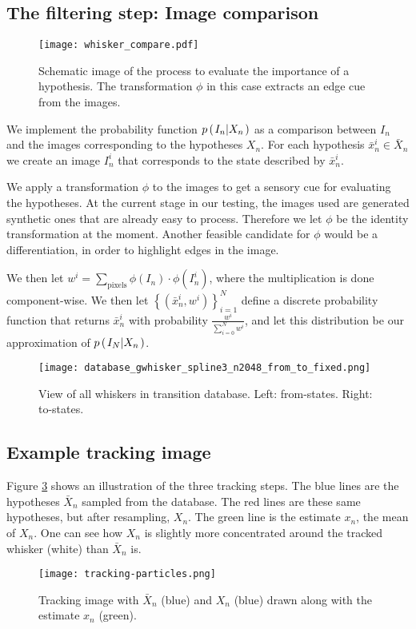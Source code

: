 \subsection*{The filtering step: Image comparison}

\begin{figure}
  \centering
  \texttt{[image: whisker\_compare.pdf]}
  \caption{Schematic image of the process to evaluate the importance of a hypothesis. The transformation $\phi$ in this case extracts an edge cue from the images.}
  \label{fig:whisker_compare}
\end{figure}

We implement the probability function $p\left(\left. I_n \middle\vert X_n \right.\right)$ as a comparison between $I_n$ and the images corresponding to the hypotheses $X_n$. For each hypothesis $\bar{x}_n^i \in \bar{X}_n$ we create an image $I_n^i$ that corresponds to the state described by $\bar{x}_n^i$.

We apply a transformation $\phi$ to the images to get a sensory cue for evaluating the hypotheses. At the current stage in our testing, the images used are generated synthetic ones that are already easy to process. Therefore we let $\phi$ be the identity transformation at the moment. Another feasible candidate for $\phi$ would be a differentiation, in order to highlight edges in the image.

We then let $w^i = \sum\limits_{\mathrm{pixels}}\phi\left(I_n\right) \cdot \phi\left(I_n^i\right)$, where the multiplication is done component-wise. We then let $\left\{\left(\bar{x}_n^i, w^i\right)\right\}_{i=1}^N$ define a discrete probability function that returns $\bar{x}_n^i$ with probability $\frac{w^i}{\sum_{i=0}^Nw^i}$, and let this distribution be our approximation of $p\left(\left. I_N \middle\vert X_n \right.\right)$.

\begin{figure}
  \centering
  \texttt{[image: database\_gwhisker\_spline3\_n2048\_from\_to\_fixed.png]}
  \caption{View of all whiskers in transition database. Left: from-states. Right: to-states.}
  \label{fig:database}
\end{figure}

\subsection*{Example tracking image}

Figure \ref{fig:particles} shows an illustration of the three tracking steps. The blue lines are the hypotheses $\bar{X}_n$ sampled from the database. The red lines are these same hypotheses, but after resampling, $X_n$. The green line is the estimate $x_n$, the mean of $X_n$. One can see how $X_n$ is slightly more concentrated around the tracked whisker (white) than $\bar{X}_n$ is.

\begin{figure}[h]
  \centering
  \texttt{[image: tracking-particles.png]}
  \caption{Tracking image with $\bar{X}_n$ (blue) and $X_n$ (blue) drawn along with the estimate $x_n$ (green).}
  \label{fig:particles}
\end{figure}

